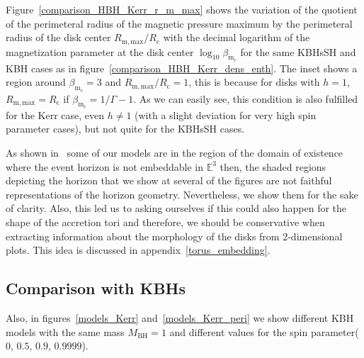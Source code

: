 \documentclass[twocolumn,aps,showpacs,showkeys,prd,superscriptaddress,byrevtex, amsmath]{revtex4-1}
\begin{document}
Figure~\ref{comparison_HBH_Kerr_r_m_max} shows the variation of the quotient of the perimeteral radius of the magnetic pressure maximum by the perimeteral radius of the disk center $R_{\mathrm{m, max}}/R_{\mathrm{c}}$ with the decimal logarithm of the magnetization parameter at the disk center $\log_{10} \beta_{\mathrm{m_c}}$ for the same KBHsSH and KBH cases as in figure~\ref{comparison_HBH_Kerr_dens_enth}. The inset shows a region around $\beta_{\mathrm{m_c}} = 3$ and $R_{\mathrm{m, max}}/R_{\mathrm{c}} = 1$, this is because for disks with $h = 1$, $R_{\mathrm{m, max}} = R_{\mathrm{c}}$ if $\beta_{\mathrm{m_c}} = 1 / \Gamma - 1$. As we can easily see, this condition is also fulfilled for the Kerr case, even $h \neq 1$ (with a slight deviation for very high spin parameter cases), but not quite for the KBHsSH cases.


As shown in~\cite{Delgado:2018} some  of our models are in the region of the domain of existence where the event horizon is not embeddable in $\mathbb{E}^3$ then, the shaded regions depicting the horizon that we show at several of the figures are not faithful representations of the horizon geometry. Nevertheless, we show them for the sake of clarity. Also, this led us to asking ourselves if this could also happen for the shape of the accretion tori and therefore, we should be conservative when extracting information about the morphology of the disks from 2-dimensional plots. This idea is discussed in appendix~\ref{torus_embedding}.

\subsection{Comparison with KBHs}

Also, in figures~\ref{models_Kerr} and~\ref{models_Kerr_peri} we show different KBH models with the same mass $M_{\mathrm{BH}} = 1$ and different values for the spin parameter($0$, $0.5$, $0.9$, $0.9999$). 
\end{document}
